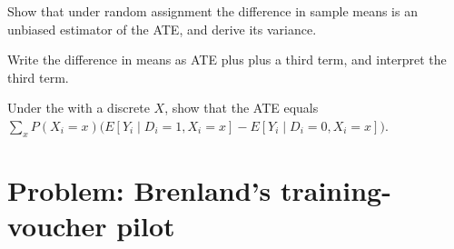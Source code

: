 \begin{exercise}[$\star\star\star$]\label{exo:b2:causality-and-experiments:10}
Show that under random assignment the difference in sample means is an unbiased estimator of the ATE, and derive its
variance.
\end{exercise}

\begin{exercise}[$\star\star\star$]\label{exo:b2:causality-and-experiments:11}
Write the difference in means as ATE plus  plus a third term, and interpret the third term.
\end{exercise}

\begin{exercise}[$\star\star\star$]\label{exo:b2:causality-and-experiments:12}
Under the  with a discrete $X$, show that the ATE equals $\sum_xP(X_i =
x)\bigl(E[Y_i \mid D_i = 1, X_i = x] - E[Y_i \mid D_i = 0, X_i = x]\bigr)$.
\end{exercise}

\section{Problem: Brenland's training-voucher pilot}\label{sec:b2:causality-and-experiments:problem}

